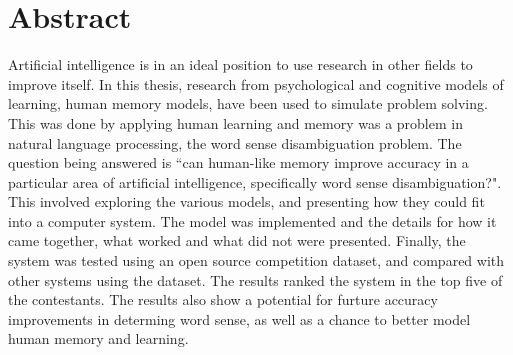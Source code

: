 \doublespacing 
\chapter*{Abstract}

Artificial intelligence is in an ideal position to use research in other fields
to improve itself.  In this thesis, research from psychological and cognitive
models of learning, human memory models, have been used to simulate problem
solving.  This was done by applying human learning and memory was a problem in
natural language processing, the word sense disambiguation problem. The question being answered is ``can human-like memory improve accuracy in a particular area of artificial intelligence, specifically word sense disambiguation?". This involved exploring the various models, and presenting how they could fit into a computer system.  The model was implemented and the details for how it came together, what worked and what did not were presented.  Finally, the system was tested using an open source competition dataset, and compared with other systems using the dataset.  The results ranked the system in the top five of the contestants. The results also show a potential for furture accuracy improvements in determing word sense, as well as a chance to better model human memory and learning.
